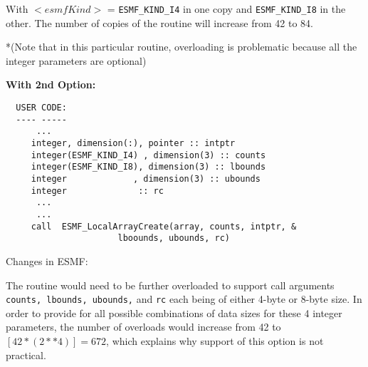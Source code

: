 With $<esmfKind>$ = {\tt ESMF\_KIND\_I4} in one copy and {\tt ESMF\_KIND\_I8} in the other. The number of copies of the routine will increase from 42 to 84.

*(Note that in this particular routine, overloading is problematic because all the integer parameters are optional)

{\bf With 2nd Option:}
\begin{verbatim}
  USER CODE:
  ---- -----
      ...
     integer, dimension(:), pointer :: intptr
     integer(ESMF_KIND_I4) , dimension(3) :: counts
     integer(ESMF_KIND_I8), dimension(3) :: lbounds
     integer             , dimension(3) :: ubounds
     integer              :: rc
      ...
      ...
     call  ESMF_LocalArrayCreate(array, counts, intptr, &
                      lboounds, ubounds, rc)
\end{verbatim}
Changes in ESMF:

The routine would need to be further overloaded to support call arguments {\tt counts, lbounds, ubounds,} and {\tt rc} each being of either 4-byte or 8-byte size. In order to provide for all possible combinations of data sizes for these 4 integer parameters, the number of overloads would increase from 42 to $[42*(2**4)]=672$, which explains why support of this option is not practical. 















